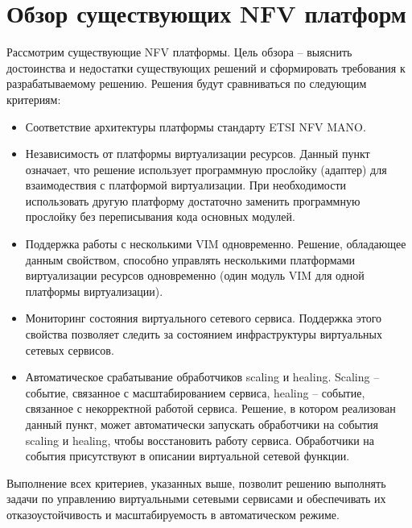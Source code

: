 \documentclass[oneside,final,14pt,a4paper]{extreport}
\begin{document}
\chapter{Обзор существующих NFV платформ}
\label{nfv_platform_overview}
Рассмотрим существующие NFV платформы. Цель обзора -- выяснить достоинства и недостатки существующих решений и сформировать требования к разрабатываемому решению. Решения будут сравниваться по следующим критериям:
\begin{itemize}
	\item Соответствие архитектуры платформы стандарту ETSI NFV MANO.
	\item Независимость от платформы виртуализации ресурсов. Данный пункт означает, что решение использует программную прослойку (адаптер) для взаимодествия с платформой виртуализации. При необходимости использовать другую платформу достаточно заменить программную прослойку без переписывания кода основных модулей.
	\item Поддержка работы с несколькими VIM одновременно. Решение, обладающее данным свойством, способно управлять несколькими платформами виртуализации ресурсов одновременно (один модуль VIM для одной платформы виртуализации).
	\item Мониторинг состояния виртуального сетевого сервиса. Поддержка этого свойства позволяет следить за состоянием инфраструктуры виртуальных сетевых сервисов.
	\item Автоматическое срабатывание обработчиков scaling и healing. Scaling -- событие, связанное с масштабированием сервиса, healing -- событие, связанное с некорректной работой сервиса. Решение, в котором реализован данный пункт, может автоматически запускать обработчики на события scaling и healing, чтобы восстановить работу сервиса. Обработчики на события присутствуют в описании виртуальной сетевой функции.
\end{itemize}

Выполнение всех критериев, указанных выше, позволит решению выполнять задачи по управлению виртуальными сетевыми сервисами и обеспечивать их отказоустойчивость и масштабируемость в автоматическом режиме.
\end{document}
